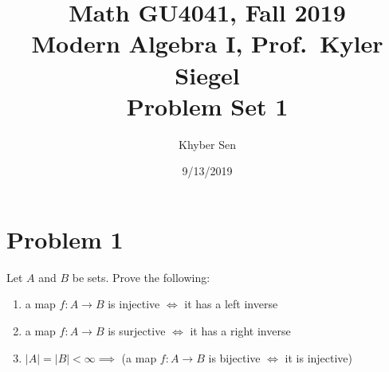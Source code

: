 \documentclass[fleqn]{article}
\title{
Math GU4041, Fall 2019 \\
Modern Algebra I, Prof.\ Kyler Siegel \\
Problem Set 1
}
\author{Khyber Sen}
\date{9/13/2019}
\begin{document}
    
    \maketitle
    
    \section{Problem 1}
    Let $A$ and $B$ be sets.  Prove the following:
        \begin{enumerate}
            \item a map $f: A \to B$ is injective $\iff$ it has a left inverse
            \item a map $f: A \to B$ is surjective $\iff$ it has a right inverse
            \item $|A| = |B| < \infty \implies$ (a map $f: A \to B$ is bijective $\iff$ it is injective)
        \end{enumerate}
        
\end{document}
